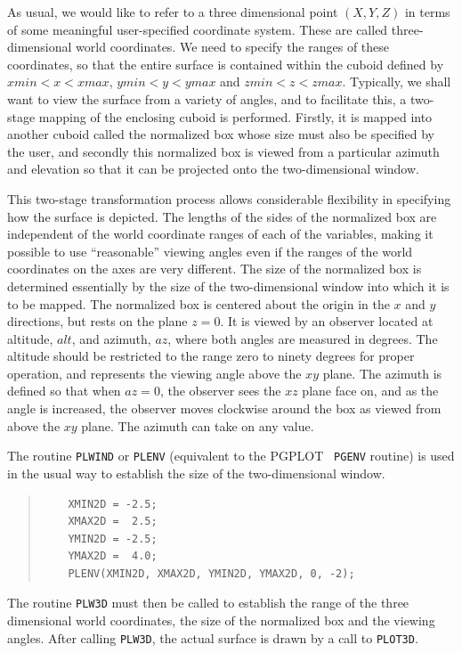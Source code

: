 \documentclass[twoside,11pt]{article}
\begin{document}
As usual, we would like to refer to a three dimensional point $(X, Y,
Z)$ in terms of some meaningful user-specified coordinate system.
These are called three-dimensional world coordinates. We need to
specify the ranges of these coordinates, so that the entire surface is
contained within the cuboid defined by $xmin<x<xmax$, $ymin<y<ymax$
and $zmin<z<zmax$. Typically, we shall want to view the surface from a
variety of angles, and to facilitate this, a two-stage mapping of the
enclosing cuboid is performed. Firstly, it is mapped into another
cuboid called the normalized box whose size must also be specified by
the user, and secondly this normalized box is viewed from a particular
azimuth and elevation so that it can be projected onto the
two-dimensional window. 

This two-stage transformation process allows considerable flexibility
in specifying how the surface is depicted. The lengths of the sides of
the normalized box are independent of the world coordinate ranges of
each of the variables, making it possible to use ``reasonable''
viewing angles even if the ranges of the world coordinates on the axes
are very different. The size of the normalized box is determined
essentially by the size of the two-dimensional window into which it is
to be mapped. The normalized box is centered about the origin in the
$x$ and $y$ directions, but rests on the plane $z = 0$. It is viewed
by an observer located at altitude, $alt$, and azimuth, $az$, where
both angles are measured in degrees. The altitude should be restricted
to the range zero to ninety degrees for proper operation, and
represents the viewing angle above the $xy$ plane. The azimuth is
defined so that when $az = 0$, the observer sees the $xz$ plane face
on, and as the angle is increased, the observer moves clockwise around
the box as viewed from above the $xy$ plane. The azimuth can take on
any value. 

The routine {\tt PLWIND} or {\tt PLENV} (equivalent to the PGPLOT {\tt
PGENV} routine) is used in the usual way to establish the size of the
two-dimensional window. 

\small
\begin{quote}
\begin{verbatim}
    XMIN2D = -2.5;
    XMAX2D =  2.5;
    YMIN2D = -2.5;
    YMAX2D =  4.0;
    PLENV(XMIN2D, XMAX2D, YMIN2D, YMAX2D, 0, -2);
\end{verbatim}
\end{quote}
\normalsize

The routine {\tt PLW3D} must then be called to establish the range of
the three dimensional world coordinates, the size of the normalized
box and the viewing angles. After calling {\tt PLW3D}, the actual
surface is drawn by a call to {\tt PLOT3D}. 
\end{document}
